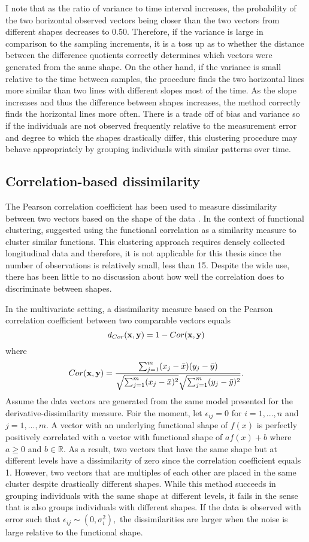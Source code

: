 I note that as the ratio of variance to time interval increases, the probability of the two horizontal observed vectors being closer than the two vectors from different shapes decreases to 0.50. Therefore, if the variance is large in comparison to the sampling increments, it is a toss up as to whether the distance between the difference quotients correctly determines which vectors were generated from the same shape. On the other hand, if the variance is small relative to the time between samples, the procedure finds the two horizontal lines more similar than two lines with different slopes most of the time. As the slope increases and thus the difference between shapes increases, the method correctly finds the horizontal lines more often. There is a trade off of bias and variance so if the individuals are not observed frequently relative to the measurement error and degree to which the shapes drastically differ, this clustering procedure may behave appropriately by grouping individuals with similar patterns over time. 

\subsection{Correlation-based dissimilarity}
The Pearson correlation coefficient has been used to measure dissimilarity between two vectors based on the shape of the data  \cite{chouakria2007,  eisen1998, chiou2008}. In the context of functional clustering, \textcite{chiou2008} suggested using the functional correlation as a similarity measure to cluster similar functions. This clustering approach requires densely collected longitudinal data and therefore, it is not applicable for this thesis since the number of observations is relatively small, less than 15. Despite the wide use, there has been little to no discussion about how well the correlation does to discriminate between shapes.

In the multivariate setting, a dissimilarity measure based on the Pearson correlation coefficient between two comparable vectors equals 
$$d_{Cor}(\mathbf x,\mathbf y) = 1-Cor(\mathbf x,\mathbf y)$$ 
where $$Cor(\mathbf x,\mathbf y) = \frac{\sum^{m}_{j=1}(x_{j}-\bar{x})(y_{j}-\bar{y})}{\sqrt{\sum^{m}_{j=1}(x_{j}-\bar{x})^{2}}\sqrt{\sum^{m}_{j=1}(y_{j}-\bar{y})^{2}}}.$$
Assume the data vectors are generated from the same model presented for the derivative-dissimilarity measure. Foir the moment, let $\epsilon_{ij}=0$ for $i=1,...,n$ and $j=1,...,m$. A vector with an underlying functional shape of $f(x)$ is perfectly positively correlated with a vector with functional shape of $af(x) + b$ where $a\geq0$ and $b\in\mathbb{R}$. As a result, two vectors that have the same shape but at different levels have a dissimilarity of zero since the correlation coefficient equals 1. However, two vectors that are multiples of each other are placed in the same cluster despite drastically different shapes. While this method succeeds in grouping individuals with the same shape at different levels, it fails in the sense that is also groups individuals with different shapes. If the data is observed with error such that $\epsilon_{ij}\sim(0,\sigma_{i}^{2}),$ the dissimilarities are larger when the noise is large relative to the functional shape. 


